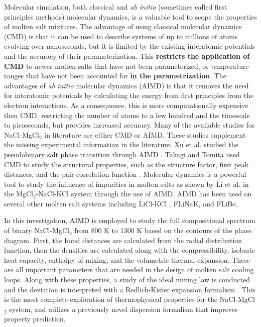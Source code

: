 \documentclass[review]{elsarticle}
\providecommand{\DIFaddtex}[1]{{\bf #1}} %
\providecommand{\DIFdeltex}[1]{} %
\providecommand{\DIFaddbegin}{\protect\color{blue}} %
\providecommand{\DIFaddend}{\protect\color{black}} %
\providecommand{\DIFdelbegin}{\protect\color{red}} %
\providecommand{\DIFdelend}{\protect\color{black}} %
\providecommand{\DIFadd}[1]{\texorpdfstring{\DIFaddtex{#1}}{#1}} %
\providecommand{\DIFdel}[1]{\texorpdfstring{\DIFdeltex{#1}}{}} %
\newcommand{\DIFscaledelfig}{0.5}
\newlength{\DIFdelgraphicswidth} %
\newlength{\DIFdelgraphicsheight} %
\newcommand{\DIFaddincludegraphics}[2][]{{\color{blue}\fbox{\DIFOincludegraphics[#1]{#2}}}} %
\newcommand{\DIFdelincludegraphics}[2][]{%
\sbox{\DIFdelgraphicsbox}{\DIFOincludegraphics[#1]{#2}}%
\settoboxwidth{\DIFdelgraphicswidth}{\DIFdelgraphicsbox} %
\settoboxtotalheight{\DIFdelgraphicsheight}{\DIFdelgraphicsbox} %
\scalebox{\DIFscaledelfig}{%
\parbox[b]{\DIFdelgraphicswidth}{\usebox{\DIFdelgraphicsbox}\\[-\baselineskip] \rule{\DIFdelgraphicswidth}{0em}}\llap{\resizebox{\DIFdelgraphicswidth}{\DIFdelgraphicsheight}{%
\setlength{\unitlength}{\DIFdelgraphicswidth}%
\begin{picture}(1,1)%
\thicklines\linethickness{2pt} %
{\color[rgb]{1,0,0}\put(0,0){\framebox(1,1){}}}%
{\color[rgb]{1,0,0}\put(0,0){\line( 1,1){1}}}%
{\color[rgb]{1,0,0}\put(0,1){\line(1,-1){1}}}%
\end{picture}%
}\hspace*{3pt}}} %
} %
\DeclareRobustCommand{\DIFaddbegin}{\DIFOaddbegin \let\includegraphics\DIFaddincludegraphics} %
\DeclareRobustCommand{\DIFaddend}{\DIFOaddend \let\includegraphics\DIFOincludegraphics} %
\DeclareRobustCommand{\DIFdelbegin}{\DIFOdelbegin \let\includegraphics\DIFdelincludegraphics} %
\DeclareRobustCommand{\DIFdelend}{\DIFOaddend \let\includegraphics\DIFOincludegraphics} %
\begin{document}
Molecular simulation, both classical and \textit{ab initio} (sometimes called first principles methods) molecular dynamics, is a valuable tool to scope the properties of molten salt mixtures. The advantage of using classical molecular dynamics (CMD) is that it can be used to describe systems of up to millions of atoms evolving over nanoseconds, but it is limited by the existing interatomic potentials and the accuracy of their parameterization. This \DIFdelbegin \DIFdel{limits their application }\DIFdelend \DIFaddbegin \DIFadd{restricts the application of CMD }\DIFaddend to newer molten salts that have not been parameterized, or temperature ranges that have not been accounted for \DIFaddbegin \DIFadd{in the parametrization}\DIFaddend . The advantages of \textit{ab initio} molecular dynamics (AIMD) is that it removes the need for interatomic potentials by calculating the energy from first principles from the electron interactions. As a consequence, this is more computationally expensive then CMD, restricting the number of atoms to a few hundred and the timescale to picoseconds, but provides increased accuracy. Many of the available studies for NaCl-MgCl$_{2}$ in literature are either CMD or AIMD. These studies supplement the missing experimental information in the literature. Xu et al. studied the pseudobinary salt phase transition through AIMD \cite{XU2020568}. Takagi and Tomita used CMD to study the structural properties, such as the structure factor, first peak distances, and the pair correlation function \cite{takagi1993structure}. Molecular dynamics is a powerful tool to study the influence of impurities in molten salts as shown by Li et al. \cite{li2020insight} in the MgCl$_{2}$-NaCl-KCl system through the use of AIMD. AIMD has been used on several other molten salt systems including LiCl-KCl \cite{Duemmler2021,Bengston2014,Song2017}, FLiNaK\cite{NAM2014148}, and FLiBe\cite{NAM2014148}. 

In this investigation, AIMD is employed to study the full compositional spectrum of binary NaCl-MgCl$_{2}$ from 800 K to 1300 K based on the contours of the phase diagram. First, the bond distances are calculated from the radial distribution function, then the densities are calculated along with the compressibility, isobaric heat capacity, enthalpy of mixing, and the volumetric thermal expansion. These are all important parameters that are needed in the design of molten salt cooling loops. Along with these properties, a study of the ideal mixing law is conducted and the deviation is interpreted with a Redlich-Kister expansion formalism \cite{redlich1948}. This is the most complete exploration of thermophysical properties for the NaCl-MgCl$_2$ system, and utilizes a previously novel dispersion formalism that improves property prediction. 
\end{document}
